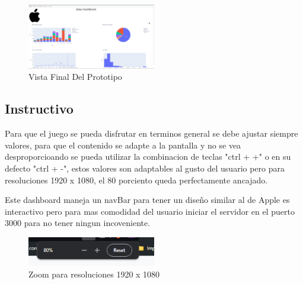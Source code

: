\documentclass[conference]{IEEEtran}
\begin{document}
\begin{figure}[h] %
    \centering
    \includegraphics[width=0.5\textwidth]{images/DashBoardViews.png} %
    \caption{Vista Final Del Prototipo}
    \label{fig:mi_imagen}
\end{figure}

\subsection{Instructivo}
Para que el juego se pueda disfrutar en terminos general se debe ajustar siempre valores, para que el contenido se adapte a la pantalla y no se vea desproporcioando se pueda utilizar la combinacion de teclas "ctrl + +" o en su defecto "ctrl + -", estos valores son adaptables al gusto del usuario pero para resoluciones 1920 x 1080, el 80 porciento queda perfectamente ancajado.

Este dashboard maneja un navBar para tener un diseño similar al de Apple es interactivo pero para mas comodidad del usuario iniciar el servidor en el puerto 3000 para no tener ningun incoveniente.
\begin{figure}[h] %
    \centering
    \includegraphics[width=0.5\textwidth]{images/80.png} %
    \caption{Zoom para resoluciones 1920 x 1080}
    \label{fig:mi_imagen}
\end{figure}
\end{document}

